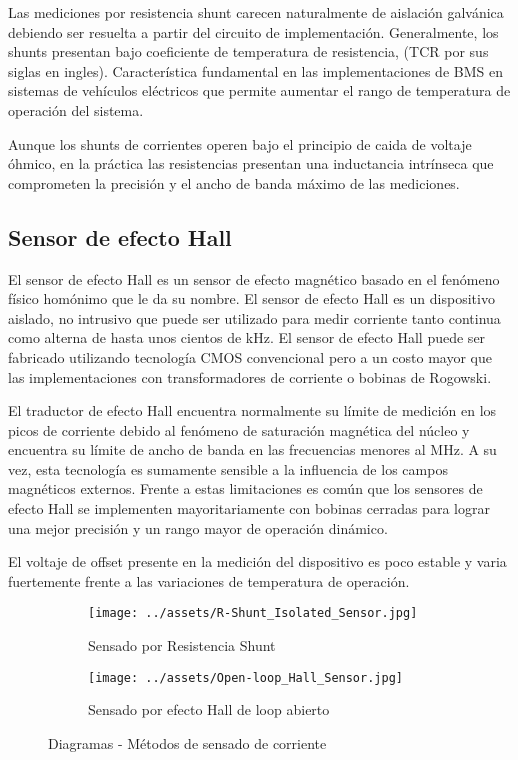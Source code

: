 Las mediciones por resistencia shunt carecen naturalmente de aislación galvánica
debiendo ser resuelta a partir del circuito de implementación. Generalmente, los
shunts presentan bajo coeficiente de temperatura de resistencia, (\acrfull{TCR}
por sus siglas en ingles). Característica fundamental en las implementaciones de
\acrshort{BMS} en sistemas de vehículos eléctricos que permite aumentar el rango
de temperatura de operación del sistema.

Aunque los shunts de corrientes operen bajo el principio de caida de voltaje
\'ohmico, en la práctica las resistencias presentan una inductancia intrínseca 
que comprometen la precisión y el ancho de banda máximo de las mediciones.

\subsection{Sensor de efecto Hall}

El sensor de efecto Hall es un sensor de efecto magnético basado en el fenómeno
físico homónimo que le da su nombre.  El sensor de efecto Hall es un dispositivo
aislado, no intrusivo que puede ser utilizado para medir corriente tanto
continua como alterna de hasta unos cientos de kHz. El sensor de efecto Hall 
puede ser fabricado utilizando tecnología CMOS convencional pero a un costo 
mayor que las implementaciones con transformadores de corriente o bobinas de 
Rogowski.

El traductor de efecto Hall encuentra normalmente su límite de medición en los
picos de corriente debido al fenómeno de saturación magnética del núcleo y
encuentra su límite de ancho de banda en las frecuencias menores al MHz. A su
vez, esta tecnología es sumamente sensible a la influencia de los campos
magnéticos externos. Frente a estas limitaciones es común que los sensores de
efecto Hall se implementen mayoritariamente con bobinas cerradas para lograr una
mejor precisión y un rango mayor de operación dinámico.

El voltaje de offset presente en la medición del dispositivo es poco estable y
varia fuertemente frente a las variaciones de temperatura de operación.

\begin{figure}[h!]
    \centering
    \begin{subfigure}[b]{0.4\linewidth}
	\texttt{[image: ../assets/R-Shunt\_Isolated\_Sensor.jpg]}
	\caption{Sensado por Resistencia Shunt}
    \end{subfigure}%
    \hspace{15mm}
    \begin{subfigure}[b]{0.4\linewidth}
	\texttt{[image: ../assets/Open-loop\_Hall\_Sensor.jpg]}
	\caption{Sensado por efecto Hall de loop abierto}
    \end{subfigure}
    \caption{Diagramas - Métodos de sensado de corriente}
    \label{fig:SenseMetods}
\end{figure}

